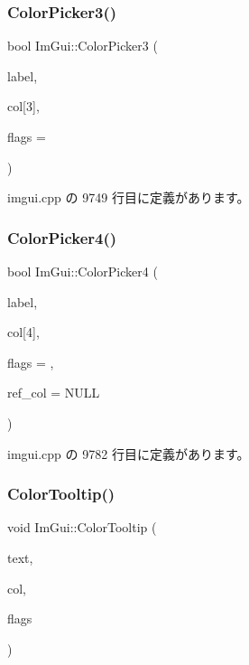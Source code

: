 \subsubsection{\texorpdfstring{Color\+Picker3()}{ColorPicker3()}}
{\footnotesize\ttfamily bool Im\+Gui\+::\+Color\+Picker3 (\begin{DoxyParamCaption}\item[{const char $\ast$}]{label,  }\item[{float}]{col\mbox{[}3\mbox{]},  }\item[{\mbox{\hyperlink{imgui_8h_a6b2d5e95adc38f22c021252189f669c6}{Im\+Gui\+Color\+Edit\+Flags}}}]{flags = {} }\end{DoxyParamCaption})}



 imgui.\+cpp の 9749 行目に定義があります。

\mbox{\label{namespace_im_gui_a3d5aae9e0a14aa051d5a799abbe97b32}} 
\subsubsection{\texorpdfstring{Color\+Picker4()}{ColorPicker4()}}
{\footnotesize\ttfamily bool Im\+Gui\+::\+Color\+Picker4 (\begin{DoxyParamCaption}\item[{const char $\ast$}]{label,  }\item[{float}]{col\mbox{[}4\mbox{]},  }\item[{\mbox{\hyperlink{imgui_8h_a6b2d5e95adc38f22c021252189f669c6}{Im\+Gui\+Color\+Edit\+Flags}}}]{flags = {},  }\item[{const float $\ast$}]{ref\+\_\+col = {\ttfamily NULL} }\end{DoxyParamCaption})}



 imgui.\+cpp の 9782 行目に定義があります。

\mbox{\label{namespace_im_gui_afad90b366b6471e3b13175c0ebeb26c8}} 
\subsubsection{\texorpdfstring{Color\+Tooltip()}{ColorTooltip()}}
{\footnotesize\ttfamily void Im\+Gui\+::\+Color\+Tooltip (\begin{DoxyParamCaption}\item[{const char $\ast$}]{text,  }\item[{const float $\ast$}]{col,  }\item[{\mbox{\hyperlink{imgui_8h_a6b2d5e95adc38f22c021252189f669c6}{Im\+Gui\+Color\+Edit\+Flags}}}]{flags }\end{DoxyParamCaption})}




